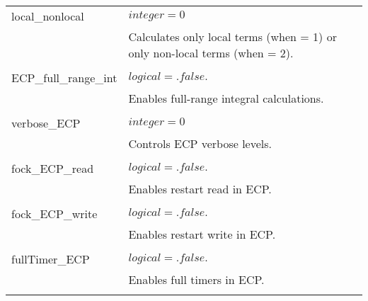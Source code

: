 \begin{Spacing}{1.0}
\begin{longtable}{ p{} p{} }
      local\_nonlocal & $ integer = 0 $ \\
      & Calculates only local terms (when = 1) or
      only non-local terms (when = 2).\\
      \\
   
      ECP\_full\_range\_int & $ logical = .false. $ \\
      & Enables full-range integral calculations.\\
      \\
   
      verbose\_ECP & $ integer = 0 $ \\
      & Controls ECP verbose levels.\\
      \\
   
      fock\_ECP\_read & $ logical = .false. $ \\
      & Enables restart read in ECP.\\
      \\
   
      fock\_ECP\_write & $ logical = .false. $ \\
      & Enables restart write in ECP.\\
      \\
   
      fullTimer\_ECP & $ logical = .false. $ \\
      & Enables full timers in ECP.\\
      \\
   
   \end{longtable}
   \label{tablaECP}
\end{Spacing}




